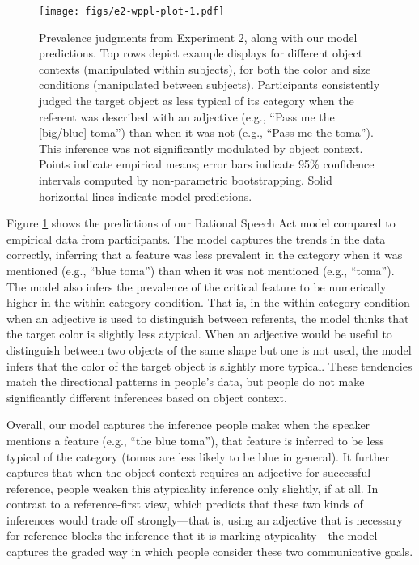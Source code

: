 \documentclass[
  english,
  man,floatsintext]{apa6}
\begin{document}
\begin{figure}
\centering
\texttt{[image: figs/e2-wppl-plot-1.pdf]}
\caption{\label{fig:e2-wppl-plot}Prevalence judgments from Experiment 2, along with our model predictions. Top rows depict example displays for different object contexts (manipulated within subjects), for both the color and size conditions (manipulated between subjects). Participants consistently judged the target object as less typical of its category when the referent was described with an adjective (e.g., ``Pass me the {[}big/blue{]} toma'') than when it was not (e.g., ``Pass me the toma''). This inference was not significantly modulated by object context. Points indicate empirical means; error bars indicate 95\% confidence intervals computed by non-parametric bootstrapping. Solid horizontal lines indicate model predictions.}
\end{figure}

Figure \ref{fig:e2-wppl-plot} shows the predictions of our Rational Speech Act model compared to empirical data from participants. The model captures the trends in the data correctly, inferring that a feature was less prevalent in the category when it was mentioned (e.g., ``blue toma'') than when it was not mentioned (e.g., ``toma''). The model also infers the prevalence of the critical feature to be numerically higher in the within-category condition. That is, in the within-category condition when an adjective is used to distinguish between referents, the model thinks that the target color is slightly less atypical. When an adjective would be useful to distinguish between two objects of the same shape but one is not used, the model infers that the color of the target object is slightly more typical. These tendencies match the directional patterns in people's data, but people do not make significantly different inferences based on object context.

Overall, our model captures the inference people make: when the speaker mentions a feature (e.g., ``the blue toma''), that feature is inferred to be less typical of the category (tomas are less likely to be blue in general). It further captures that when the object context requires an adjective for successful reference, people weaken this atypicality inference only slightly, if at all. In contrast to a reference-first view, which predicts that these two kinds of inferences would trade off strongly---that is, using an adjective that is necessary for reference blocks the inference that it is marking atypicality---the model captures the graded way in which people consider these two communicative goals.
\end{document}
